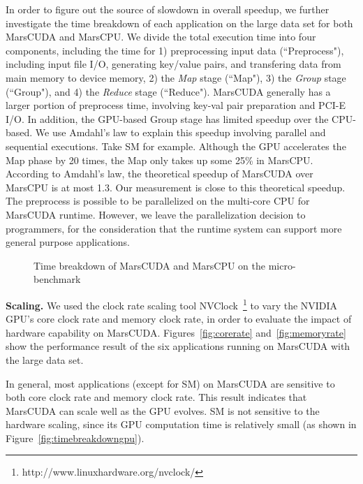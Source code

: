 In order to figure out the source of slowdown in overall speedup, we further investigate the time breakdown of each application on the large data set for both MarsCUDA and MarsCPU. We divide the total execution time into four components,
including the time for 1) preprocessing input data (``Preprocess"), including input file I/O, generating key/value pairs, and transfering data from main memory to device memory, 2) the
{\em Map} stage (``Map"), 3) the {\em Group} stage (``Group"), and 4) the {\em
Reduce} stage (``Reduce"). 
MarsCUDA generally has a larger portion of preprocess time, involving key-val pair preparation and PCI-E I/O. In addition, the GPU-based Group stage has limited speedup over the CPU-based. We use Amdahl's law to explain this speedup involving parallel and sequential executions. Take SM for example. Although the GPU accelerates the Map phase by 20 times, the Map only takes up some 25\% in MarsCPU. According to Amdahl's law, the theoretical speedup of MarsCUDA over MarsCPU is at most 1.3. Our measurement is close to this theoretical speedup.
The preprocess is possible to be parallelized on the multi-core CPU for MarsCUDA runtime. 
However, we leave the parallelization decision to programmers, for the consideration that the runtime system can support more general purpose applications. 

\begin{figure}[h]
\centerline{  \hfill {} } \caption{Time breakdown of MarsCUDA
and MarsCPU on the micro-benchmark} \label{fig:timebreakdown}
\end{figure}

{\bf Scaling.} We used the clock rate scaling tool
NVClock~\footnote{http://www.linuxhardware.org/nvclock/} to vary the
NVIDIA GPU's core clock rate and memory clock rate, in order to
evaluate the impact of hardware capability on MarsCUDA. Figures~\ref{fig:corerate} and~\ref{fig:memoryrate} show the
performance result of the six applications running on MarsCUDA with
the large data set.

In general, most applications (except for SM) on MarsCUDA are
sensitive to both core clock rate and memory clock rate.
This result indicates that MarsCUDA can scale well as the GPU evolves.
SM is not sensitive to the hardware scaling, since its GPU computation time is relatively small (as shown in Figure~\ref{fig:timebreakdowngpu}).

